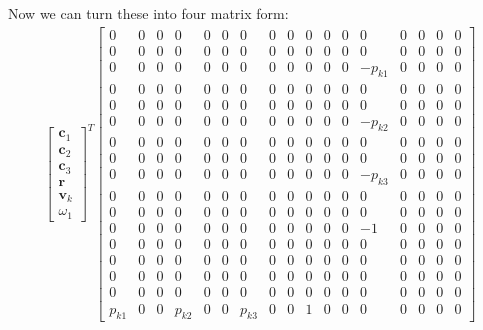\documentclass{article}
\begin{document}
Now we can turn these into four matrix form:
\begin{align}
    \begin{bmatrix}
        \mathbf{c}_1 \\
        \mathbf{c}_2 \\
        \mathbf{c}_3 \\
        \mathbf{r} \\
        \mathbf{v}_k \\
        \omega_1
    \end{bmatrix}^T 
    \begin{bmatrix}
        0 & 0 & 0 & 0 & 0 & 0 & 0 & 0 & 0 & 0 & 0 & 0 & 0 & 0 & 0 & 0 & 0 \\
        0 & 0 & 0 & 0 & 0 & 0 & 0 & 0 & 0 & 0 & 0 & 0 & 0 & 0 & 0 & 0 & 0 \\
        0 & 0 & 0 & 0 & 0 & 0 & 0 & 0 & 0 & 0 & 0 & 0 & -p_{k1} & 0 & 0 & 0 & 0 \\
        0 & 0 & 0 & 0 & 0 & 0 & 0 & 0 & 0 & 0 & 0 & 0 & 0 & 0 & 0 & 0 & 0 \\
        0 & 0 & 0 & 0 & 0 & 0 & 0 & 0 & 0 & 0 & 0 & 0 & 0 & 0 & 0 & 0 & 0 \\
        0 & 0 & 0 & 0 & 0 & 0 & 0 & 0 & 0 & 0 & 0 & 0 & -p_{k2} & 0 & 0 & 0 & 0 \\
        0 & 0 & 0 & 0 & 0 & 0 & 0 & 0 & 0 & 0 & 0 & 0 & 0 & 0 & 0 & 0 & 0 \\
        0 & 0 & 0 & 0 & 0 & 0 & 0 & 0 & 0 & 0 & 0 & 0 & 0 & 0 & 0 & 0 & 0 \\
        0 & 0 & 0 & 0 & 0 & 0 & 0 & 0 & 0 & 0 & 0 & 0 & -p_{k3} & 0 & 0 & 0 & 0 \\
        0 & 0 & 0 & 0 & 0 & 0 & 0 & 0 & 0 & 0 & 0 & 0 & 0 & 0 & 0 & 0 & 0 \\
        0 & 0 & 0 & 0 & 0 & 0 & 0 & 0 & 0 & 0 & 0 & 0 & 0 & 0 & 0 & 0 & 0 \\
        0 & 0 & 0 & 0 & 0 & 0 & 0 & 0 & 0 & 0 & 0 & 0 & -1 & 0 & 0 & 0 & 0 \\
        0 & 0 & 0 & 0 & 0 & 0 & 0 & 0 & 0 & 0 & 0 & 0 & 0 & 0 & 0 & 0 & 0 \\
        0 & 0 & 0 & 0 & 0 & 0 & 0 & 0 & 0 & 0 & 0 & 0 & 0 & 0 & 0 & 0 & 0 \\
        0 & 0 & 0 & 0 & 0 & 0 & 0 & 0 & 0 & 0 & 0 & 0 & 0 & 0 & 0 & 0 & 0 \\
        0 & 0 & 0 & 0 & 0 & 0 & 0 & 0 & 0 & 0 & 0 & 0 & 0 & 0 & 0 & 0 & 0 \\
        p_{k1} & 0 & 0 & p_{k2} & 0 & 0 & p_{k3} & 0 & 0 & 1 & 0 & 0 & 0 & 0 & 0 & 0 & 0
    \end{bmatrix}

\end{align}
\end{document}

